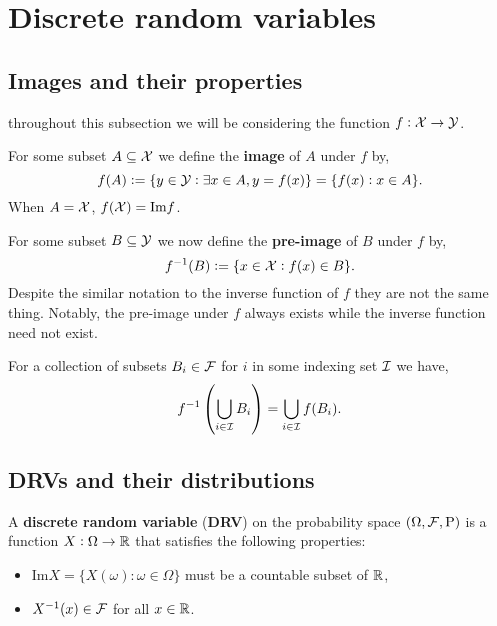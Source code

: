 \section{Discrete random variables}
\subsection{Images and their properties}
throughout this subsection we will be considering the function $f:\mathcal{X} \rightarrow \mathcal{Y}$.
\begin{definition}[Image]
    For some subset $A \subseteq \mathcal{X}$ we define the \textbf{image} of $A$ under $f$ by, \[
        f(A) := \{y \in \mathcal{Y}: \exists x \in A, y = f(x)\} = \{f(x): x \in A\} \textcolor{black}{.}
    \]
When $A = \mathcal{X}$, $f(\mathcal{X}) = \text{Im}f$.
\end{definition}

\begin{definition}
    For some subset $B \subseteq \mathcal{Y}$ we now define the \textbf{pre-image} of $B$ under $f$ by, \[
    f^{-1}(B) := \{x\in\mathcal{X}: f(x) \in B\} \textcolor{black}{.}
    \]
Despite the similar notation to the inverse function of $f$ they are not the same thing. Notably, the pre-image under $f$ always exists while the inverse function need not exist.
\end{definition}

\begingroup\belowdisplayskip=-10pt
\begin{lemma}
    For a collection of subsets $B_i \in \mathcal{F}$ for $i$ in some indexing set $\mathcal{I}$ we have, \[
        f^{-1}\left(\bigcup_{i\in\mathcal{I}} B_i \right) = \bigcup_{i\in\mathcal{I}} f(B_i) \textcolor{black}{.}
    \]
\end{lemma}
\endgroup

\subsection{DRVs and their distributions}

\begin{definition}
    A \textbf{discrete random variable} (\textbf{DRV}) on the probability space $(\Omega, \mathcal{F}, \mathrm{P})$ is a function $X: \Omega \rightarrow \mathbb{R}$ that satisfies the following properties:
    \begin{itemize}
        \item $\text{Im}X = \{X(\omega): \omega \in \Omega\}$ must be a countable subset of $\mathbb{R}$,
        \item $X^{-1}(x) \in \mathcal{F}$ for all $x \in \mathbb{R}$.
    \end{itemize}
\end{definition}

